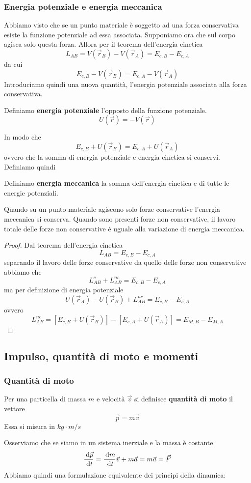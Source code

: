 \documentclass{article}
\theoremstyle{plain}
\begin{document}
\subsubsection{Energia potenziale e energia meccanica}
Abbiamo visto che se un punto materiale è soggetto ad una forza conservativa esiste la funzione potenziale ad essa associata. Supponiamo ora che sul corpo agisca solo questa forza. Allora per il teorema dell'energia cinetica 
\[L_{AB} = V(\vec r_B) - V(\vec r_A) = E_{c,B} - E_{c,A}\]
da cui
\[E_{c,B} - V(\vec r_B) = E_{c,A} - V(\vec r_A)\]
Introduciamo quindi una nuova quantità, l'energia potenziale associata alla forza conservativa.
\begin{boxdef}
    Definiamo \textbf{energia potenziale} l'opposto della funzione potenziale.
    \[U(\vec r) =- V(\vec r)\]
\end{boxdef}
In modo che 
\[E_{c,B} + U(\vec r_B) = E_{c,A} + U(\vec r_A)\]
ovvero che la somma di energia potenziale e energia cinetica si conservi. Definiamo quindi 
\begin{boxdef}
    Definiamo \textbf{energia meccanica} la somma dell'energia cinetica e di tutte le energie potenziali.
\end{boxdef}

\begin{shadedTheorem}
    Quando su un punto materiale agiscono solo forze conservative l'energia meccanica si conserva. Quando sono presenti forze non conservative, il lavoro totale delle forze non conservative è uguale alla variazione di energia meccanica.
\end{shadedTheorem}
\begin{proof}
    Dal teorema dell'energia cinetica
    \[L_{AB} = E_{c,B} - E_{c,A}\]
    separando il lavoro delle forze conservative da quello delle forze non conservative abbiamo che
    \[L_{AB}^c + L_{AB}^{nc} = E_{c,B} - E_{c,A}\]
    ma per definizione di energia potenziale
    \[U(\vec r_A) -U(\vec r_B) + L_{AB}^{nc} = E_{c,B} - E_{c,A}\]
    ovvero
    \[L_{AB}^{nc} = \left[E_{c,B} +U(\vec r_B)\right] - \left[E_{c,A} +U(\vec r_A)\right] = E_{M,B} - E_{M,A}\]
\end{proof}
\subsection{Impulso, quantità di moto e momenti}
\subsubsection{Quantità di moto}
\begin{boxdef}
    Per una particella di massa $m$ e velocità $\vec v$ si definisce \textbf{quantità di moto} il vettore 
    \[\vec p = m \vec v\]
    Essa si misura in $kg \cdot m/s$
\end{boxdef}
Osserviamo che se siamo in un sistema inerziale e la massa è costante
\[\frac{\:\text{d}\vec p}{\:\text{d} t}=\frac{\:\text{d} m}{\:\text{d} t}\vec v+m\vec a=m\vec a = \vec F\]
Abbiamo quindi una formulazione equivalente dei principi della dinamica:
\end{document}
